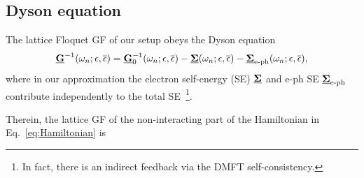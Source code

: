 \documentclass[aps,prb,groupedaddress,showpacs,twocolumn,superscriptaddress,10pt]{revtex4-2}
\begin{document}
\subsection{Dyson equation} 
\label{sec:Dyson_equation}

The lattice Floquet GF of our setup obeys the Dyson equation 
\begin{equation}\label{eq:FullDysonEq}
\underline{{\bf G}}^{-1}(\omega_n;\epsilon,\overline{\epsilon}) = \underline{{\bf G}}^{-1}_{0}(\omega_n;\epsilon,\overline{\epsilon}) - \underline{{\bf \Sigma}}(\omega_n;\epsilon,\overline{\epsilon}) - \underline{{\bf \Sigma}}_{\text{e-ph}}(\omega_n;\epsilon,\overline{\epsilon}),
\end{equation}
where in our approximation the electron self-energy (SE) $ \underline{{\bf \Sigma}}$ and e-ph SE $\underline{{\bf \Sigma}}_{\text{e-ph}}$ contribute independently to the total SE~\footnote{In fact, there is an indirect feedback via the DMFT self-consistency.}.


Therein, the lattice GF of the non-interacting part of the Hamiltonian in Eq.~\eqref{eq:Hamiltonian} is 
\end{document}
